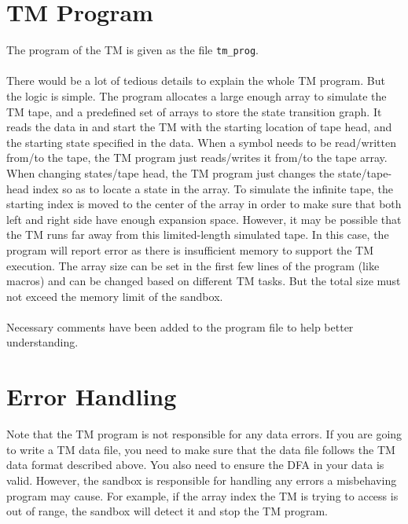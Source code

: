 \documentclass[11pt]{article}
\begin{document}
\section{TM Program}
The program of the TM is given as the file {\tt tm\_prog}. \\\\
There would be a lot of tedious details to explain the whole TM program. But the logic is simple. The program allocates a large enough array to simulate the TM tape, and a predefined set of arrays to store the state transition graph. It reads the data in and start the TM with the starting location of tape head, and the starting state specified in the data. When a symbol needs to be read/written from/to the tape, the TM program just reads/writes it from/to the tape array. When changing states/tape head, the TM program just changes the state/tape-head index so as to locate a state in the array. To simulate the infinite tape, the starting index is moved to the center of the array in order to make sure that both left and right side have enough expansion space. However, it may be possible that the TM runs far away from this limited-length simulated tape. In this case, the program will report error as there is insufficient memory to support the TM execution. The array size can be set in the first few lines of the program (like macros) and can be changed based on different TM tasks. But the total size must not exceed the memory limit of the sandbox. \\
\\
Necessary comments have been added to the program file to help better understanding. 

\section{Error Handling}
Note that the TM program is not responsible for any data errors. If you are going to write a TM data file, you need to make sure that the data file follows the TM data format described above. You also need to ensure the DFA in your data is valid. However, the sandbox is responsible for handling any errors a misbehaving program may cause. For example, if the array index the TM is trying to access is out of range, the sandbox will detect it and stop the TM program.
\end{document}
